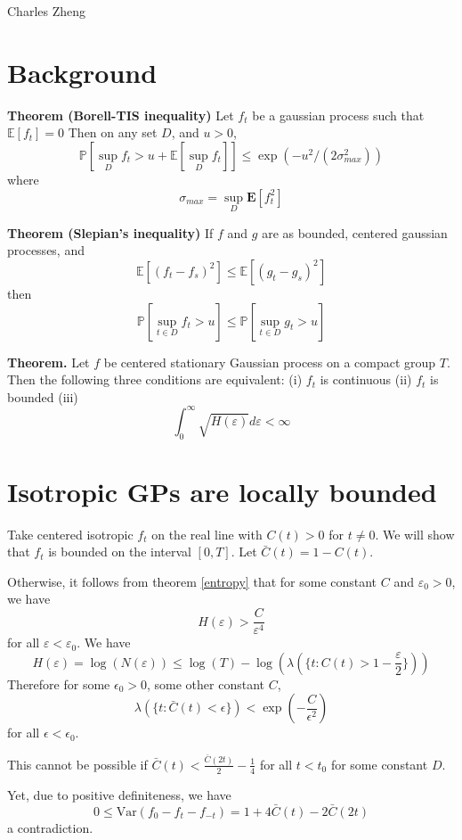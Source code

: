 \documentclass[11pt]{article}
\begin{document}
\newcommand{\tr}{\text{tr}}
\newcommand{\E}{\textbf{E}}
\newcommand{\diag}{\text{diag}}
\newcommand{\argmax}{\text{argmax}}
\newcommand{\Cov}{\text{Cov}}
\newcommand{\Var}{\text{Var}}

Charles Zheng

\section{Background}

\noindent\textbf{Theorem (Borell-TIS inequality)}
Let $f_t$ be a gaussian process such that $\mathbb{E}[f_t] = 0$
Then on any set $D$, and $u > 0$, 
\[
\mathbb{P}[\sup_D f_t > u + \mathbb{E}[\sup_D f_t]] \leq \exp(-u^2/(2\sigma_{max}^2))
\]
where
\[
\sigma_{max} = \sup_D \E[f_t^2]
\]

\noindent\textbf{Theorem (Slepian's inequality)}
If $f$ and $g$ are as bounded, centered gaussian processes, and
\[
\mathbb{E}[(f_t-f_s)^2] \leq \mathbb{E}[(g_t-g_s)^2]
\]
then
\[
\mathbb{P}[\sup_{t \in D} f_t  > u] \leq \mathbb{P}[\sup_{t \in D} g_t  > u]
\]

\noindent\textbf{Theorem.}\label{entropy} Let $f$ be centered stationary Gaussian
process on a compact group $T$. Then the following three conditions
are equivalent: (i) $f_t$ is continuous (ii) $f_t$ is bounded (iii)
\[
\int_0^\infty \sqrt{H(\varepsilon)} d\varepsilon < \infty 
\]

\section{Isotropic GPs are locally bounded}

Take centered isotropic $f_t$ on the real line with $C(t) > 0$ for $t
\neq 0$.  We will show that $f_t$ is bounded on the interval
$[0,T]$. Let $\bar{C}(t) = 1-C(t)$.

Otherwise, it follows from theorem \ref{entropy} that 
for some constant $C$ and $\varepsilon_0 > 0$, we have
\[
H(\varepsilon) > \frac{C}{\varepsilon^4}
\]
for all $\varepsilon < \varepsilon_0$.
We have
\[
H(\varepsilon) = \log(N(\varepsilon)) \leq \log(T) - \log(\lambda(\{t:
C(t) > 1-\frac{\varepsilon}{2}\}))
\]
Therefore for some $\epsilon_0 > 0$, some other constant $C$,
\[
\lambda(\{t: \bar{C}(t) < \epsilon\}) < \exp(-\frac{C}{\epsilon^2})
\]
for all $\epsilon < \epsilon_0$.

This cannot be possible if $\bar{C}(t) <
\frac{\bar{C}(2t)}{2}-\frac{1}{4}$ for all $t < t_0$ for some constant
$D$.

Yet, due to positive definiteness, we have
\[
0 \leq \Var(f_0- f_t - f_{-t}) = 1+ 4\bar{C}(t) - 2\bar{C}(2t)
\]
a contradiction.
\end{document}
